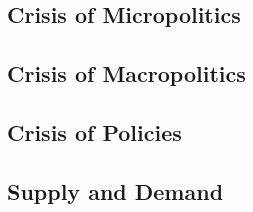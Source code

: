 \subsection{Crisis of Micropolitics}

\subsection{Crisis of Macropolitics}


\subsection{Crisis of Policies}

\subsection{Supply and Demand}




